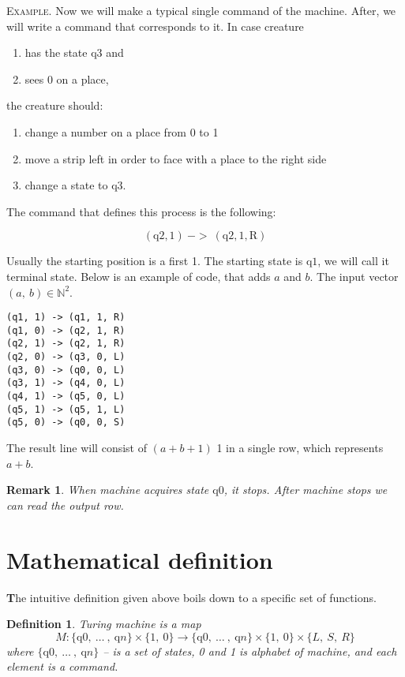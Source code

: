 \documentclass[12pt]{article}
\newcommand\tab[1][-1em]{\hspace*{#1}}
\newtheorem*{remark}{Remark}
\newtheorem{definition}{Definition}[section]
\begin{document}
 \vspace{5mm}
\begin{addmargin}[3em]{3em}
\tab
\textsc{Example.} Now we will make a typical single command of the machine. After, we will write a command that corresponds to it. In case creature
\begin{enumerate}
\item has the state $\mathrm{q}3$ and \item sees 0 on a place,
\end{enumerate}
the creature should: 
\begin{enumerate}
\item change a number on a place from 0 to 1 \item move a strip left in order to face with a place to the right side \item change a state to $\mathrm{q}3$. 
\end{enumerate}


The command that defines this process is the following:

{\large $$(\mathrm{q}2, 1)\ ->\ (\mathrm{q}2, 1, \mathrm{R})$$}
\end{addmargin}
Usually the starting position is a first 1. The starting state is $\mathrm{q}1$, we will call it terminal state.
Below is an example of code, that adds $a$ and $b$. The input vector $(a,\ b)\in\mathbb{N}^2$.

\begin{lstlisting}
(q1, 1) -> (q1, 1, R)
(q1, 0) -> (q2, 1, R)
(q2, 1) -> (q2, 1, R)
(q2, 0) -> (q3, 0, L)
(q3, 0) -> (q0, 0, L)
(q3, 1) -> (q4, 0, L)
(q4, 1) -> (q5, 0, L)
(q5, 1) -> (q5, 1, L)
(q5, 0) -> (q0, 0, S)
\end{lstlisting}

The result line will consist of $(a+b+1)$ 1 in a single row, which represents $a+b$.
\begin{remark} When machine acquires state $\mathrm{q}0$, it stops. After machine stops we can read the output row.
\end{remark}

\section{Mathematical definition}
\textbf{\large T}he intuitive definition given above boils down to a specific set of functions. 
\begin{definition}
Turing machine is a map
$$ M:\{\mathrm{q}0,\ \dots\ ,\ \mathrm{q}n\} \times \{ 1,\ 0\} \rightarrow \{\mathrm{q}0,\ \dots\ ,\ \mathrm{q}n\} \times \{ 1,\ 0\} \times \{L,\ S,\ R\}$$
where $\{\mathrm{q}0,\ \dots\ ,\ \mathrm{q}n\}$ -- is a set of states, 0 and 1 is alphabet of machine, and each element is a command.
\end{definition}
\end{document}
